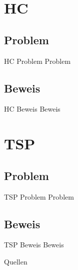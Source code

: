\documentclass[12pt,donthandout,notes=dontshow,xcolor=table]{beamer}
\begin{document}
\section{HC}
\subsection{Problem}
\begin{frame}{HC Problem}
Problem
\end{frame}

\subsection{Beweis}
\begin{frame}{HC Beweis}
Beweis
\end{frame}


\section{TSP}
\subsection{Problem}
\begin{frame}{TSP Problem}
Problem
\end{frame}

\subsection{Beweis}
\begin{frame}{TSP Beweis}
Beweis
\end{frame}

\begin{frame}{Quellen}
\printbibliography
\end{frame}
\end{document}
